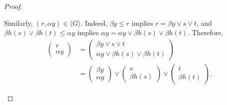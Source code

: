 \begin{proof}
\begin{itemize}
Similarly, $(r, \alpha y) \in \langle G \rangle$.  Indeed, $\beta y \leqslant r$ 
implies $r = \beta y \vee s\vee t$, and 
$\beta {h(s)} \vee \beta {h(t)} \leqslant \alpha y$ implies 
$\alpha y = \alpha y \vee \beta {h(s)} \vee \beta {h(t)}$. Therefore,
\begin{align*}
\left(\begin{array}{c} r \\ \alpha y\end{array}\right) 
&= \left(\begin{array}{c} \beta y \vee s\vee t \\ \alpha y \vee \beta {h(s)} \vee \beta {h(t)} \end{array}\right)\\
&= \left(\begin{array}{c} \beta y\\ \alpha y\end{array}\right) \vee 
\left(\begin{array}{c}s \\ \beta {h(s)}\end{array}\right) \vee \left(\begin{array}{c}t \\ \beta {h(t)} \end{array}\right).
\end{align*}


\end{itemize}
\end{proof}
